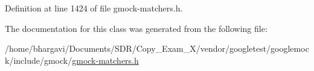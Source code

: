 Definition at line 1424 of file gmock-\/matchers.\+h.



The documentation for this class was generated from the following file\+:\begin{DoxyCompactItemize}
\item 
/home/bhargavi/\+Documents/\+S\+D\+R/\+Copy\+\_\+\+Exam\+\_\+X/vendor/googletest/googlemock/include/gmock/\hyperlink{gmock-matchers_8h}{gmock-\/matchers.\+h}\end{DoxyCompactItemize}
